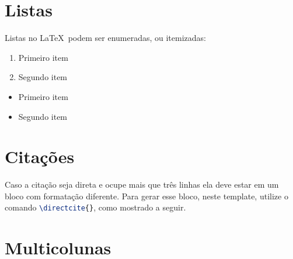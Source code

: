 
\section{Listas}
\label{sec:listas}

    Listas no \LaTeX\ podem ser enumeradas, ou itemizadas:


    \begin{enumerate}
        \item Primeiro item
        \item Segundo item
    \end{enumerate}


    \begin{itemize}
        \item Primeiro item
        \item Segundo item
    \end{itemize}


\section{Citações}

    Caso a citação seja direta e ocupe mais que três linhas ela deve estar em um bloco com formatação diferente.
    Para gerar esse bloco, neste template, utilize o comando \lstinline[language=TeX,style=code]|\directcite{}|, como mostrado a seguir.




\section{Multicolunas}
\label{sec:multicolunas}

